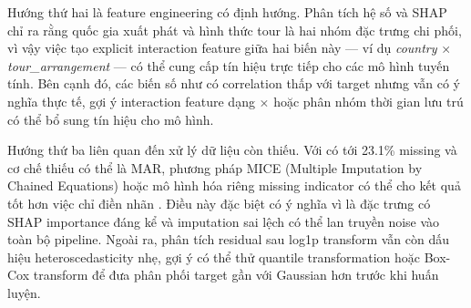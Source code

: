 Hướng thứ hai là feature engineering có định hướng. Phân tích hệ số và SHAP chỉ ra rằng quốc gia xuất phát và hình thức tour là hai nhóm đặc trưng chi phối, vì vậy việc tạo explicit interaction feature giữa hai biến này — ví dụ \textit{country} $\times$ \textit{tour\_arrangement} — có thể cung cấp tín hiệu trực tiếp cho các mô hình tuyến tính. Bên cạnh đó, các biến số như  có correlation thấp với target nhưng vẫn có ý nghĩa thực tế, gợi ý interaction feature dạng  $\times$  hoặc phân nhóm thời gian lưu trú có thể bổ sung tín hiệu cho mô hình.

Hướng thứ ba liên quan đến xử lý dữ liệu còn thiếu. Với  có tới 23.1\% missing và cơ chế thiếu có thể là MAR, phương pháp MICE (Multiple Imputation by Chained Equations) hoặc mô hình hóa riêng missing indicator có thể cho kết quả tốt hơn việc chỉ điền nhãn . Điều này đặc biệt có ý nghĩa vì  là đặc trưng có SHAP importance đáng kể và imputation sai lệch có thể lan truyền noise vào toàn bộ pipeline. Ngoài ra, phân tích residual sau log1p transform vẫn còn dấu hiệu heteroscedasticity nhẹ, gợi ý có thể thử quantile transformation hoặc Box-Cox transform để đưa phân phối target gần với Gaussian hơn trước khi huấn luyện.

